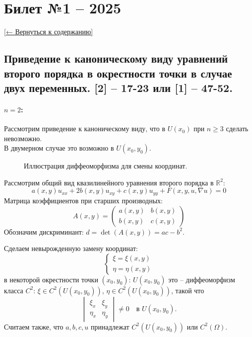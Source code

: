 \documentclass[12pt, a4paper]{article}
\newcommand{\backtotoc}{\small\hyperref[toc]{[← Вернуться к содержанию]}}
\begin{document}
\newpage

\section*{Билет №1 -- 2025}\label{sec:ticket1}
\backtotoc
\subsection*{Приведение к каноническому виду уравнений второго порядка в окрестности точки в случае
двух переменных. [2] -- 17-23 или [1] -- 47-52.}

\paragraph{$n=2$:}
Рассмотрим приведение к каноническому виду, что в $U(x_0)$ при $n \ge 3$ сделать невозможно. \\
В двумерном случае это возможно в $U(x_0, y_0)$.

\begin{figure}[h!]
\centering
\caption{Иллюстрация диффеоморфизма для смены координат.}
\label{fig:diffeomorphism}
\end{figure}

Рассмотрим общий вид квазилинейного уравнения второго порядка в $\mathbb{R}^2$:
\begin{equation} \label{eq:quasilinear}
a(x,y) u_{xx} + 2b(x,y) u_{xy} + c(x,y) u_{yy} + F(x, y, u, \nabla u) = 0 \tag{$*$}
\end{equation}
Матрица коэффициентов при старших производных:
\[
A(x,y) = \begin{pmatrix} a(x,y) & b(x,y) \\ b(x,y) & c(x,y) \end{pmatrix}
\]
Обозначим дискриминант: $d = \det(A(x,y)) = ac - b^2$.

Сделаем невырожденную замену координат:
\[
\begin{cases}
\xi = \xi(x,y) \\
\eta = \eta(x,y)
\end{cases}
\]
в некоторой окрестности точки $(x_0, y_0)$: $U(x_0, y_0)$
это -- диффеоморфизм класса $C^2$: $\xi \in C^2(U(x_0, y_0))$, $\eta \in C^2(U(x_0, y_0))$, такой что
\[
\begin{vmatrix} \xi_x & \xi_y \\ \eta_x & \eta_y \end{vmatrix} \neq 0 \quad \text{в } U(x_0, y_0).
\]
Считаем также, что $a, b, c, u$ принадлежат $C^2(U(x_0, y_0))$ или $C^2(\Omega)$.
\end{document}
